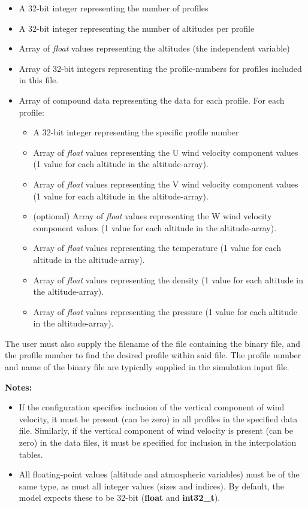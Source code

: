 \documentclass[11pt,fleqn]{report}
\begin{document}
\begin{itemize}
\item A 32-bit integer representing the number of profiles
\item A 32-bit integer representing the number of altitudes per profile
\item Array of \textit{float} values representing the altitudes
  (the independent variable)
\item Array of 32-bit integers representing the profile-numbers for
  profiles included in this file.
\item Array of compound data representing the data for each profile. 
  For each profile:
  \begin{itemize}
  \item A 32-bit integer representing the specific profile number
  \item Array of \textit{float} values representing the U wind velocity
    component values (1 value for each altitude in the altitude-array).
  \item Array of \textit{float} values representing the V wind velocity
    component values (1 value for each altitude in the altitude-array).
  \item (optional) Array of \textit{float} values representing the W
    wind velocity component values (1 value for each altitude in the
    altitude-array).
  \item Array of \textit{float} values representing the temperature
    (1 value for each altitude in the altitude-array).
  \item Array of \textit{float} values representing the density
    (1 value for each altitude in the altitude-array).
  \item Array of \textit{float} values representing the pressure
    (1 value for each altitude in the altitude-array).
  \end{itemize}
\end{itemize}

The user must also supply the filename of the file containing the binary
file, and the profile number to find the desired profile within said file.
The profile number and name of the binary file are typically
supplied in the simulation input file.

\textbf{Notes:}
\begin{itemize}
\item If the configuration specifies inclusion of the vertical
  component of wind velocity, it must be present (can be zero) in all
  profiles in the specified data file.
  Similarly, if the vertical component of wind velocity is present (can be
  zero) in the data files, it must be specified for inclusion in the
  interpolation tables.
\item All floating-point values (altitude and atmospheric variables) must be
  of the same type, as must all
  integer values (sizes and indices). By default, the model expects these to
  be 32-bit (\textbf{float} and \textbf{int32\_t}).
\end{itemize}
\end{document}
